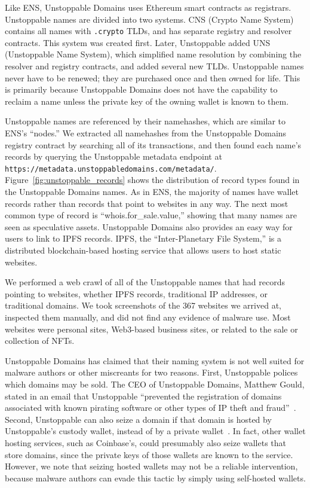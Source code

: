 \documentclass[conference]{IEEEtran}
\begin{document}

Like ENS, Unstoppable Domains uses Ethereum smart contracts as 
registrars. Unstoppable names are divided into two systems. CNS 
(Crypto Name System) contains all names with \texttt{.crypto} 
TLDs, and has separate registry and resolver contracts. This 
system was created first. Later, Unstoppable added UNS 
(Unstoppable Name System), which simplified name resolution by 
combining the resolver and registry contracts, and added several 
new TLDs. Unstoppable names never have to be renewed; they are 
purchased once and then owned for life. This is primarily 
because Unstoppable Domains does not have the capability to 
reclaim a name unless the private key of the owning wallet is 
known to them. 

Unstoppable names are referenced by their namehashes, which are 
similar to ENS's ``nodes.'' We extracted all namehashes from the 
Unstoppable Domains registry contract by searching all of its 
transactions, and then found each name's records by querying the 
Unstoppable metadata endpoint at 
\texttt{https://metadata.unstoppabledomains.com/metadata/}. 
Figure~\ref{fig:unstoppable_records} shows the 
distribution 
of record types found in the Unstoppable Domains names. As in 
ENS, the majority of names have wallet records rather than 
records that point to websites in any way. The next most common 
type of record is ``whois.for\_sale.value,'' showing that many 
names are seen as speculative assets. Unstoppable Domains also 
provides an easy way for users to link to IPFS records. IPFS, 
the ``Inter-Planetary File System,'' is a distributed 
blockchain-based hosting service that allows users to host 
static websites.

We performed a web crawl of all of the Unstoppable names that 
had records pointing to websites, whether IPFS records, 
traditional IP addresses, or traditional domains. We took 
screenshots of the 367 websites we arrived 
at, inspected them manually, and did not find any evidence of 
malware use. Most 
websites were personal sites, Web3-based business sites, or related to the sale 
or collection of NFTs. 

Unstoppable Domains has claimed that their naming system is not well suited for 
malware authors or other miscreants for two reasons. First, Unstoppable 
polices which domains may be sold. The CEO of Unstoppable Domains, Matthew 
Gould, stated in an email that Unstoppable ``prevented the 
registration of domains associated with known pirating software or other types 
of IP theft and fraud''~\cite{pegoraro_blockchain_2021}. Second, Unstoppable 
can also seize a domain if that 
domain is hosted by Unstoppable's custody 
wallet, instead of by a private wallet~\cite{pegoraro_blockchain_2021}. In 
fact, other wallet hosting 
services, such as Coinbase's, 
could presumably also seize wallets that store domains, since the private 
keys of those wallets are 
known to the service. However, we note that seizing hosted wallets may not 
be a reliable 
intervention, because malware authors can evade this tactic by simply using 
self-hosted wallets. 
\end{document}
